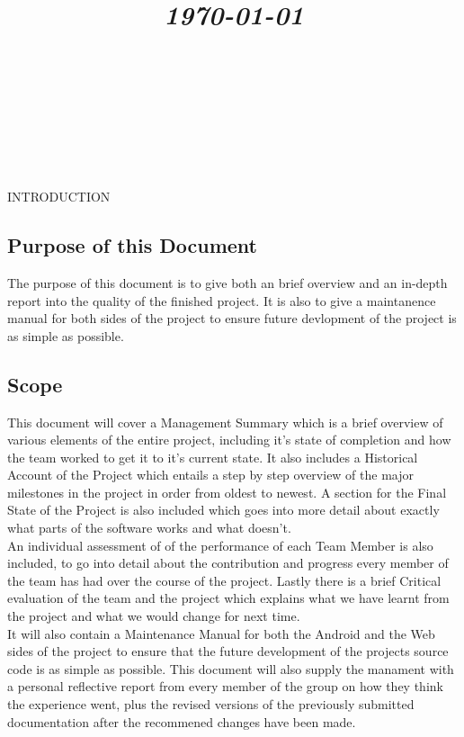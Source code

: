 \documentclass{article}
\title{
	\vspace{1.2in}
	\textmd{\textbf{\doctitle}} \\
	\vspace{0.1in}\large{\textit{\today}} \\
	\vspace{0.4in}
	{\bf{\qanumber}} \\ \vspace{0.4in}
	\version \\
	\status \\
	\vspace{0.4in}
}
\author{\authors}
\date{}
\begin{document}
	\maketitle
	\newpage
	\tableofcontents
	\newpage

	\begin{section}{INTRODUCTION}
		\subsection{Purpose of this Document}
		The purpose of this document is to give both an brief overview and an in-depth report into the quality of the finished project. It is also to give a maintanence manual for both sides of the project to ensure future devlopment of the project is as simple as possible.

		\subsection{Scope}
		This document will cover a Management Summary which is a brief overview of various elements of the entire project, including it's state of completion and how the team worked to get it to it's current state. It also includes a Historical Account of the Project which entails a step by step overview of the major milestones in the project in order from oldest to newest. A section for the Final State of the Project is also included which goes into more detail about exactly what parts of the software works and what doesn't. \\
		
		An individual assessment of of the performance of each Team Member is also included, to go into detail about the contribution and progress every member of the team has had over the course of the project. Lastly there is a brief Critical evaluation of the team and the project which explains what we have learnt from the project and what we would change for next time. \\
		
		It will also contain a Maintenance Manual for both the Android and the Web sides of the project to ensure that the future development of the projects source code is as simple as possible. This document will also supply the manament with a personal reflective report from every member of the group on how they think the experience went, plus the revised versions of the previously submitted documentation after the recommened changes have been made.


\end{section}
\end{document}
